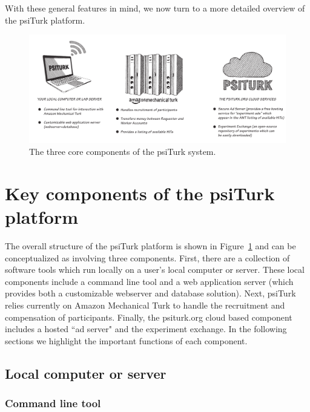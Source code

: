 \documentclass[twocolumn]{svjour3}          %
\begin{document}
With these general features in mind, we now turn to a more detailed overview of the 
\textsf{psiTurk} platform.

\begin{figure}[tp]
\centering
\includegraphics[scale=.40]{figures/psiturk-components.pdf}
\caption{The three core components of the \textsf{psiTurk} system.  }
\label{fig:components}
\end{figure}


\section{Key components of the \textsf{psiTurk} platform}

The overall structure of the \textsf{psiTurk} platform is shown in Figure~\ref{fig:components}
and can be conceptualized as involving three components.
First, there are a collection of software tools which run locally on a user's
local computer or server.  These local components include a command line tool and 
a web application server (which provides both a customizable webserver and 
database solution).  Next, \textsf{psiTurk} relies currently on Amazon
Mechanical Turk to handle the recruitment and compensation of participants.
Finally, the \textsf{psiturk.org} cloud based component includes a hosted ``ad server" 
and the experiment exchange.  In the following sections we highlight the important 
functions of each component.

\subsection{Local computer or server}

\subsubsection{Command line tool}
\end{document}
